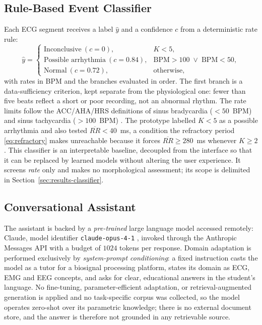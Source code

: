 \documentclass[conference]{IEEEtran}
\begin{document}
\subsection{Rule-Based Event Classifier}

Each ECG segment receives a label $\hat{y}$ and a confidence $c$ from a deterministic rate rule:
\begin{equation}
\hat{y} =
\begin{cases}
\text{Inconclusive}\ (c{=}0), & K < 5,\\
\text{Possible arrhythmia}\ (c{=}0.84), & \mathrm{BPM} > 100 \;\vee\; \mathrm{BPM} < 50,\\
\text{Normal}\ (c{=}0.72), & \text{otherwise,}
\end{cases}
\label{eq:rules}
\end{equation}
with rates in BPM and the branches evaluated in order.
The first branch is a data-sufficiency criterion, kept separate from the physiological one: fewer than five beats reflect a short or poor recording, not an abnormal rhythm. The rate limits follow the ACC/AHA/HRS definitions of sinus bradycardia ($<50$~BPM) \cite{kusumoto2019bradycardia} and sinus tachycardia ($>100$~BPM) \cite{page2016svt}. The prototype labelled $K<5$ as a possible arrhythmia and also tested $\overline{RR}<40$~ms, a condition the refractory period \eqref{eq:refractory} makes unreachable because it forces $\overline{RR}\ge 280$~ms whenever $K\ge 2$. This classifier is an interpretable baseline, decoupled from the interface so that it can be replaced by learned models \cite{LI2022103424} without altering the user experience. It screens \emph{rate} only and makes no morphological assessment; its scope is delimited in Section~\ref{sec:results-classifier}.

\subsection{Conversational Assistant}
\label{sec:llm}

The assistant is backed by a \emph{pre-trained} large language model accessed remotely: Claude, model identifier \texttt{claude-opus-4-1} \cite{anthropic-claude}, invoked through the Anthropic Messages API with a budget of $1024$ tokens per response. Domain adaptation is performed exclusively by \emph{system-prompt conditioning}: a fixed instruction casts the model as a tutor for a biosignal processing platform, states its domain as ECG, EMG and EEG concepts, and asks for clear, educational answers in the student's language. No fine-tuning, parameter-efficient adaptation, or retrieval-augmented generation is applied and no task-specific corpus was collected, so the model operates zero-shot over its parametric knowledge; there is no external document store, and the answer is therefore not grounded in any retrievable source.
\end{document}
